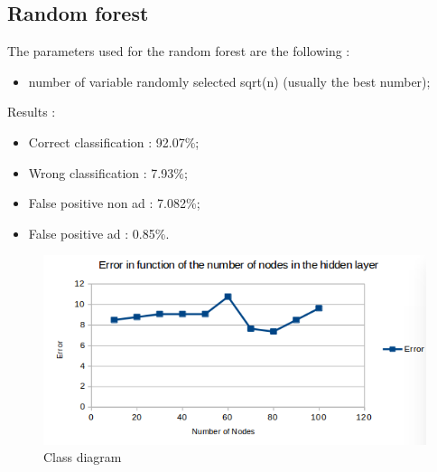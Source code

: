 \subsection{Random forest}
The parameters used for the random forest are the following :
  \begin{itemize}
    \item number of variable randomly selected sqrt(n) (usually the best number);
  \end{itemize}
Results :
\begin{itemize}
  \item Correct classification : 92.07\%;
  \item Wrong classification : 7.93\%;
  \item False positive non ad : 7.082\%;
  \item False positive ad : 0.85\%.
\end{itemize}
\begin{figure}[h]
 \centering
 \includegraphics[scale=0.5]{../images/NNPO.png}
 \caption{Class diagram}
\end{figure}
